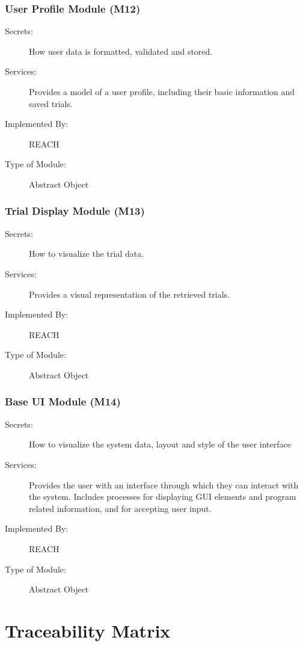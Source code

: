 \documentclass[12pt, titlepage]{article}
\begin{document}
\subsubsection{User Profile Module (M12)}
\begin{description}
\item[Secrets:] How user data is formatted, validated and stored.
\item[Services:] Provides a model of a user profile, including their basic information and saved trials.
\item[Implemented By:] REACH
\item[Type of Module:] Abstract Object \\
\end{description}

\subsubsection{Trial Display Module (M13)}
\begin{description}
\item[Secrets:] How to visualize the trial data.
\item[Services:] Provides a visual representation of the retrieved trials.
\item[Implemented By:] REACH
\item[Type of Module:]  Abstract Object \\
\end{description}

\subsubsection{Base UI Module (M14)}
\begin{description}
\item[Secrets:] How to visualize the system data, layout and style of the user interface
\item[Services:] Provides the user with an interface through which they can interact with the system. Includes processes for displaying GUI elements and program related information, and for accepting user input.
\item[Implemented By:] REACH
\item[Type of Module:] Abstract Object \\
\end{description}

\section{Traceability Matrix} \label{SecTM}
\end{document}
